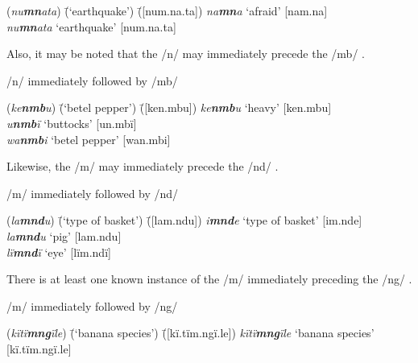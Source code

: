     \ex  {[mn]}
\begin{tabbing}
{(\textit{nu\textbf{mn}ata})} \= {(‘earthquake’)} \= {([num.na.ta])}\kill
{\textit{na\textbf{mn}a}} \> {‘afraid’} \> {[nam.na]}\\
{\textit{nu\textbf{mn}ata}} \> {‘earthquake’} \> {[num.na.ta]}
\end{tabbing}
    \z
\z

Also, it may be noted that the   /n/ may immediately precede the    /mb/ .

\ea%
    \label{ex:phon:26}
          /n/ immediately followed by /mb/\\
\begin{tabbing}
{(\textit{ke\textbf{nmb}u})} \= {(‘betel pepper’)} \= {([ken.mbu])}\kill
{\textit{ke\textbf{nmb}u}} \> {‘heavy’} \> {[ken.mbu]}\\
{\textit{u\textbf{nmb}ï}} \> {‘buttocks’} \> {[un.mbï]}\\
{\textit{wa\textbf{nmb}i}} \> {‘betel pepper’} \> {[wan.mbi]}
\end{tabbing}
\z

Likewise, the   /m/ may immediately precede the    /nd/ .

\ea%
    \label{ex:phon:27}
          /m/ immediately followed by /nd/\\
\begin{tabbing}
{(\textit{la\textbf{mnd}u})} \= {(‘type of basket’)} \= {([lam.ndu])}\kill
{\textit{i\textbf{mnd}e}} \> {‘type of basket’} \> {[im.nde]}\\
{\textit{la\textbf{mnd}u}} \> {‘pig’} \> {[lam.ndu]}\\
{\textit{lï\textbf{mnd}ï}} \> {‘eye’} \> {[lïm.ndï]}
\end{tabbing}
\z

There is at least one known instance of the   /m/ immediately preceding the    /ng/ .

\ea%
    \label{ex:phon:28}
          /m/ immediately followed by /ng/\\
\begin{tabbing}
{(\textit{kïtï\textbf{mng}ïle})} \= {(‘banana species’)} \= {([kï.tïm.ngï.le])}\kill
{\textit{kïtï\textbf{mng}ïle}} \> {‘banana species’} \> {[kï.tïm.ngï.le]}
\end{tabbing}
\z

